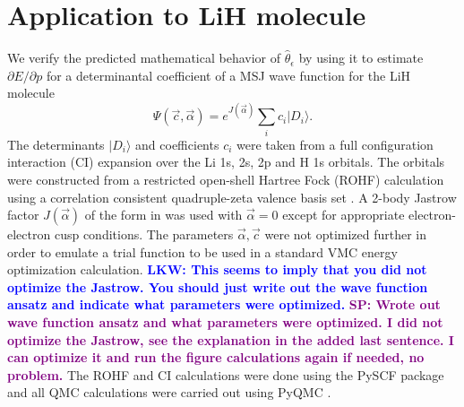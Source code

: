\documentclass[twocolumn]{revtex4-1}
\newcommand{\lucas}[1]{\textbf{\textcolor{blue}{LKW: #1}}}
\newcommand{\shivesh}[1]{\textbf{\textcolor{purple}{SP: #1}}}
\begin{document}
\section{Application to LiH molecule}
We verify the predicted mathematical behavior of $\hat{\theta}_\epsilon$ by using it to estimate $\partial E/\partial p$ for a determinantal coefficient of a MSJ wave function for the LiH molecule
\begin{equation}
\Psi(\vec{c}, \vec{\alpha}) = e^{J(\vec{\alpha})} \sum_{i} c_i  |D_i \rangle.
\end{equation}
The determinants $|D_i \rangle$ and coefficients $c_i$ were taken from a full configuration interaction (CI) expansion over the Li 1s, 2s, 2p and H 1s orbitals.
The orbitals were constructed from a restricted open-shell Hartree Fock (ROHF) calculation using a correlation consistent quadruple-zeta valence basis set \cite{doi:10.1063/1.456153}.
A 2-body Jastrow factor $J(\vec{\alpha})$ of the form in \cite{Wagner2009} was used with $\vec{\alpha} = 0$ except for appropriate electron-electron cusp conditions.
The parameters $\vec{\alpha}, \vec{c}$ were not optimized further in order to emulate a trial function to be used in a standard VMC energy optimization calculation.
\lucas{This seems to imply that you did not optimize the Jastrow. You should just write out the wave function ansatz and indicate what parameters were optimized.}
\shivesh{Wrote out wave function ansatz and what parameters were optimized. I did not optimize the Jastrow, see the explanation in the added last sentence. I can optimize it and run the figure calculations again if needed, no problem.}
The ROHF and CI calculations were done using the PySCF package \cite{PYSCF} and all QMC calculations were carried out using PyQMC \cite{pyqmc}.
\end{document}
